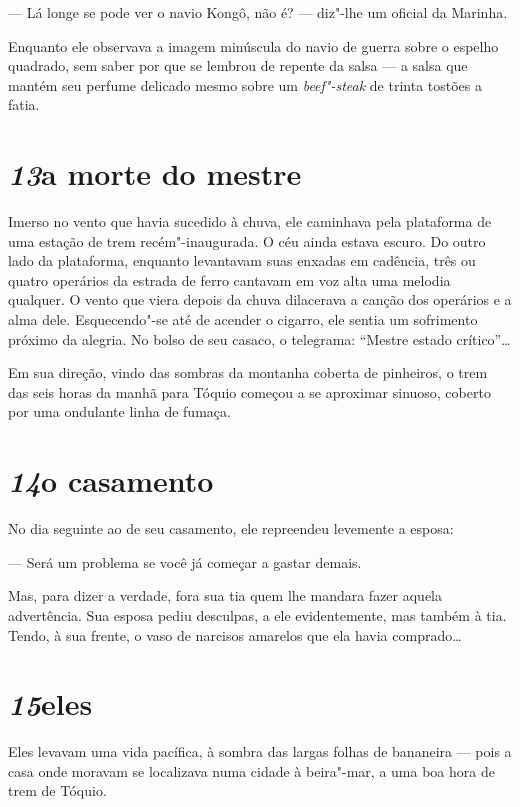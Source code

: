 --- Lá longe se pode ver o navio Kongô, não é? --- diz"-lhe um oficial da
Marinha.

Enquanto ele observava a imagem minúscula do navio de guerra sobre o
espelho quadrado, sem saber por que se lembrou de repente da salsa --- a
salsa que mantém seu perfume delicado mesmo sobre um
\textit{beef"-steak} de trinta tostões a fatia.

\section*{\textit{13}\es a morte do mestre}

Imerso no vento que havia sucedido à chuva, ele caminhava pela
plataforma de uma estação de trem recém"-inaugurada. O céu ainda estava
escuro. Do outro lado da plataforma, enquanto levantavam suas enxadas
em cadência, três ou quatro operários da estrada de ferro cantavam em
voz alta uma melodia qualquer. O vento que viera depois da chuva
dilacerava a canção dos operários e a alma dele. Esquecendo"-se até de
acender o cigarro, ele sentia um sofrimento próximo da alegria. No
bolso de seu casaco, o telegrama: ``Mestre estado crítico''\ldots{}

Em sua direção, vindo das sombras da montanha coberta de pinheiros, o
trem das seis horas da manhã para Tóquio começou a se aproximar
sinuoso, coberto por uma ondulante linha de fumaça.

\section*{\textit{14}\es o casamento}

No dia seguinte ao de seu casamento, ele repreendeu levemente a esposa:

--- Será um problema se você já começar a gastar demais.

Mas, para dizer a verdade, fora sua tia quem lhe mandara fazer aquela
advertência. Sua esposa pediu desculpas, a ele evidentemente, mas
também à tia. Tendo, à sua frente, o vaso de narcisos amarelos que ela
havia comprado\ldots{}

\section*{\textit{15}\es eles}

Eles levavam uma vida pacífica, à sombra das largas folhas de bananeira
--- pois a casa onde moravam se localizava numa cidade à beira"-mar, a uma
boa hora de trem de Tóquio.

